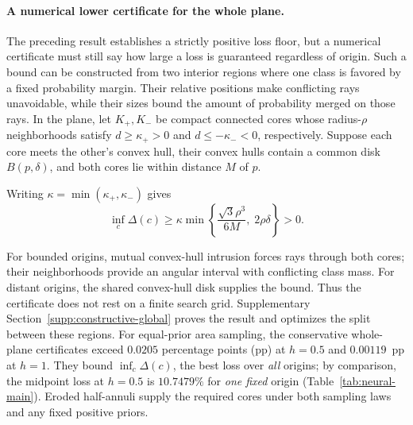 \paragraph{A numerical lower certificate for the whole plane.}
The preceding result establishes a strictly positive loss floor, but a numerical certificate must still say how large a loss is guaranteed regardless of origin. Such a bound can be constructed from two interior regions where one class is favored by a fixed probability margin. Their relative positions make conflicting rays unavoidable, while their sizes bound the amount of probability merged on those rays. In the plane, let $K_+,K_-$ be compact connected cores whose radius-$\rho$ neighborhoods satisfy $d\geq\kappa_+>0$ and $d\leq-\kappa_-<0$, respectively. Suppose each core meets the other's convex hull, their convex hulls contain a common disk $B(p,\delta)$, and both cores lie within distance $M$ of $p$.
\par\begin{samepage}
\noindent Writing $\kappa=\min(\kappa_+,\kappa_-)$ gives
\begin{equation}
 \inf_c\Delta(c)\geq\kappa\min\left\{
 \frac{\sqrt3\rho^3}{6M},\;2\rho\delta\right\}>0.
 \label{eq:constructive-global}
\end{equation}
\end{samepage}
For bounded origins, mutual convex-hull intrusion forces rays through both cores; their neighborhoods provide an angular interval with conflicting class mass. For distant origins, the shared convex-hull disk supplies the bound. Thus the certificate does not rest on a finite search grid. Supplementary Section~\ref{supp:constructive-global} proves the result and optimizes the split between these regions. For equal-prior area sampling, the conservative whole-plane certificates exceed $0.0205$ percentage points (pp) at $h=0.5$ and $0.00119$~pp at $h=1$. They bound $\inf_c\Delta(c)$, the best loss over \emph{all} origins; by comparison, the midpoint loss at $h=0.5$ is $10.7479\%$ for \emph{one fixed} origin (Table~\ref{tab:neural-main}). Eroded half-annuli supply the required cores under both sampling laws and any fixed positive priors.

